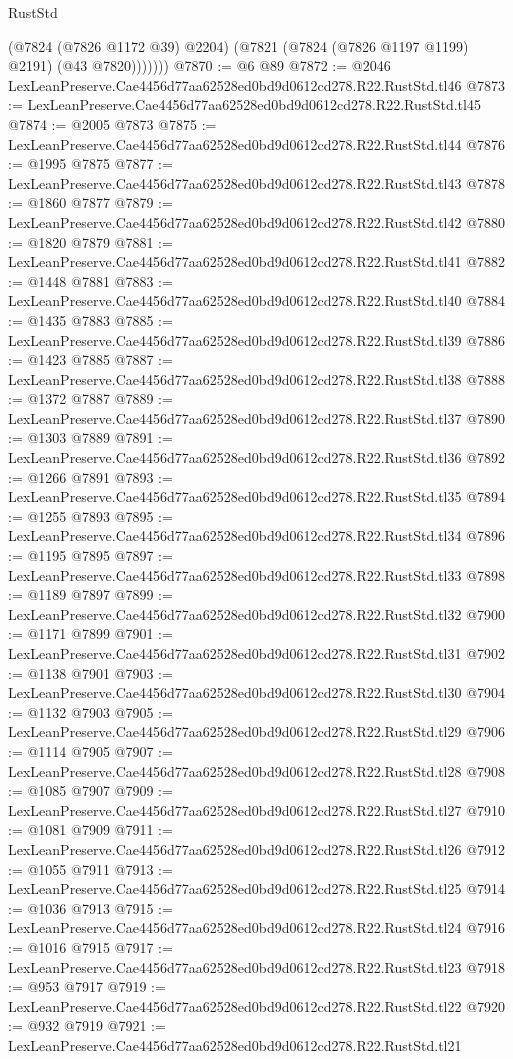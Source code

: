 \begin{lexlean}{RustStd}
\begin{coremodule}
              (@7824 (@7826 @1172 @39) @2204)
              (@7821 (@7824 (@7826 @1197 @1199) @2191) (@43 @7820)))))))
@7870 := @6 @89
@7872 := @2046 LexLeanPreserve.Cae4456d77aa62528ed0bd9d0612cd278.R22.RustStd.tl46
@7873 := LexLeanPreserve.Cae4456d77aa62528ed0bd9d0612cd278.R22.RustStd.tl45
@7874 := @2005 @7873
@7875 := LexLeanPreserve.Cae4456d77aa62528ed0bd9d0612cd278.R22.RustStd.tl44
@7876 := @1995 @7875
@7877 := LexLeanPreserve.Cae4456d77aa62528ed0bd9d0612cd278.R22.RustStd.tl43
@7878 := @1860 @7877
@7879 := LexLeanPreserve.Cae4456d77aa62528ed0bd9d0612cd278.R22.RustStd.tl42
@7880 := @1820 @7879
@7881 := LexLeanPreserve.Cae4456d77aa62528ed0bd9d0612cd278.R22.RustStd.tl41
@7882 := @1448 @7881
@7883 := LexLeanPreserve.Cae4456d77aa62528ed0bd9d0612cd278.R22.RustStd.tl40
@7884 := @1435 @7883
@7885 := LexLeanPreserve.Cae4456d77aa62528ed0bd9d0612cd278.R22.RustStd.tl39
@7886 := @1423 @7885
@7887 := LexLeanPreserve.Cae4456d77aa62528ed0bd9d0612cd278.R22.RustStd.tl38
@7888 := @1372 @7887
@7889 := LexLeanPreserve.Cae4456d77aa62528ed0bd9d0612cd278.R22.RustStd.tl37
@7890 := @1303 @7889
@7891 := LexLeanPreserve.Cae4456d77aa62528ed0bd9d0612cd278.R22.RustStd.tl36
@7892 := @1266 @7891
@7893 := LexLeanPreserve.Cae4456d77aa62528ed0bd9d0612cd278.R22.RustStd.tl35
@7894 := @1255 @7893
@7895 := LexLeanPreserve.Cae4456d77aa62528ed0bd9d0612cd278.R22.RustStd.tl34
@7896 := @1195 @7895
@7897 := LexLeanPreserve.Cae4456d77aa62528ed0bd9d0612cd278.R22.RustStd.tl33
@7898 := @1189 @7897
@7899 := LexLeanPreserve.Cae4456d77aa62528ed0bd9d0612cd278.R22.RustStd.tl32
@7900 := @1171 @7899
@7901 := LexLeanPreserve.Cae4456d77aa62528ed0bd9d0612cd278.R22.RustStd.tl31
@7902 := @1138 @7901
@7903 := LexLeanPreserve.Cae4456d77aa62528ed0bd9d0612cd278.R22.RustStd.tl30
@7904 := @1132 @7903
@7905 := LexLeanPreserve.Cae4456d77aa62528ed0bd9d0612cd278.R22.RustStd.tl29
@7906 := @1114 @7905
@7907 := LexLeanPreserve.Cae4456d77aa62528ed0bd9d0612cd278.R22.RustStd.tl28
@7908 := @1085 @7907
@7909 := LexLeanPreserve.Cae4456d77aa62528ed0bd9d0612cd278.R22.RustStd.tl27
@7910 := @1081 @7909
@7911 := LexLeanPreserve.Cae4456d77aa62528ed0bd9d0612cd278.R22.RustStd.tl26
@7912 := @1055 @7911
@7913 := LexLeanPreserve.Cae4456d77aa62528ed0bd9d0612cd278.R22.RustStd.tl25
@7914 := @1036 @7913
@7915 := LexLeanPreserve.Cae4456d77aa62528ed0bd9d0612cd278.R22.RustStd.tl24
@7916 := @1016 @7915
@7917 := LexLeanPreserve.Cae4456d77aa62528ed0bd9d0612cd278.R22.RustStd.tl23
@7918 := @953 @7917
@7919 := LexLeanPreserve.Cae4456d77aa62528ed0bd9d0612cd278.R22.RustStd.tl22
@7920 := @932 @7919
@7921 := LexLeanPreserve.Cae4456d77aa62528ed0bd9d0612cd278.R22.RustStd.tl21

\end{coremodule}
\end{lexlean}
